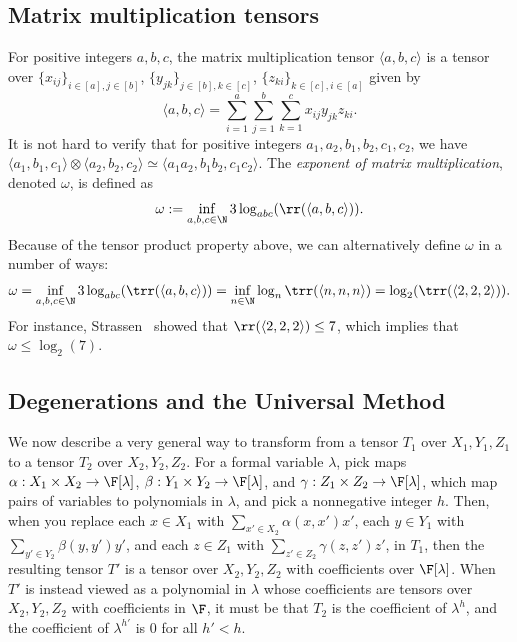 \documentclass{toc}
\begin{document}
%
\subsection{Matrix multiplication tensors}

For positive integers $a,b,c$, the matrix multiplication tensor $\langle a,b,c \rangle$ is a tensor over $\{x_{ij}\}_{i \in [a], j \in [b]}$, $\{y_{jk}\}_{j \in [b], k \in [c]}$, $\{ z_{ki} \}_{k \in [c], i \in [a]}$ given by
$$\langle a,b,c\rangle = \sum_{i=1}^a\sum_{j=1}^b\sum_{k=1}^c x_{ij}y_{jk}z_{ki}.$$
It is not hard to verify that for positive integers $a_1, a_2, b_1, b_2, c_1, c_2$, we have $\langle a_1, b_1, c_1 \rangle \otimes \langle a_2, b_2, c_2 \rangle \simeq \langle a_1 a_2, b_1 b_2, c_1 c_2 \rangle$. The \emph{exponent of matrix multiplication}, denoted $\omega$, is defined as $$\omega := \inf_{a,b,c \in \N} 3 \log_{abc}(\rr(\langle a,b,c \rangle)).$$
Because of the tensor product property above, we can alternatively define $\omega$ in a number of ways:
$$\omega = \inf_{a,b,c \in \N} 3 \log_{abc}(\trr(\langle a,b,c \rangle)) = \inf_{n \in \N} \log_n \trr(\langle n,n,n \rangle) = \log_2(\trr(\langle 2,2,2 \rangle)).$$
For instance, Strassen~\cite{strassen} showed that $\rr(\langle 2,2,2 \rangle) \leq 7$, which implies that $\omega \leq \log_2(7)$.
\subsection{Degenerations and the Universal Method}

We now describe a very general way to transform from a tensor $T_1$ over $X_1, Y_1, Z_1$ to a tensor $T_2$ over $X_2, Y_2, Z_2$. For a formal variable $\lambda$, pick maps $\alpha : X_1 \times X_2 \to \F[\lambda]$, $\beta : Y_1 \times Y_2 \to \F[\lambda]$, and $\gamma : Z_1 \times Z_2 \to \F[\lambda]$, which map pairs of variables to polynomials in $\lambda$, and pick a nonnegative integer $h$. Then, when you replace each $x \in X_1$ with $\sum_{x' \in X_2} \alpha(x,x') x'$, each $y \in Y_1$ with $\sum_{y' \in Y_2} \beta(y,y') y'$, and each $z \in Z_1$ with $\sum_{z' \in Z_2} \gamma(z,z') z'$, in $T_1$, then the resulting tensor $T'$ is a tensor over $X_2, Y_2, Z_2$ with coefficients over $\F[\lambda]$. When $T'$ is instead viewed as a polynomial in $\lambda$ whose coefficients are tensors over $X_2,Y_2,Z_2$ with coefficients in $\F$, it must be that $T_2$ is the coefficient of $\lambda^h$, and the coefficient of $\lambda^{h'}$ is $0$ for all $h'<h$.
\end{document}
